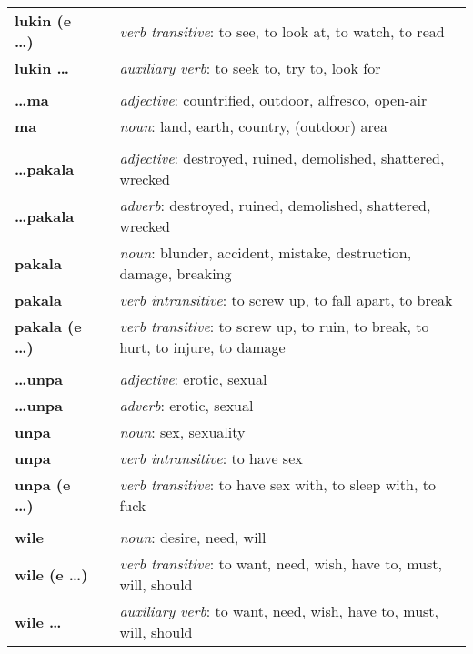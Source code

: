 \begin{supertabular}{p{2,5cm}|ll}
\textbf{lukin (e \dots)} && \textit{verb transitive}: to see, to look at, to watch, to read \\ %
\textbf{lukin \dots} && \textit{auxiliary verb}: to seek to, try to, look for \\ %
 && \\ %
\textbf{\dots ma} && \textit{adjective}: countrified, outdoor, alfresco, open-air \\ %
\textbf{ma} && \textit{noun}: land, earth, country, (outdoor) area \\ %
 && \\ %
\textbf{\dots pakala} && \textit{adjective}: destroyed, ruined, demolished, shattered, wrecked \\ %
\textbf{\dots pakala} && \textit{adverb}: destroyed, ruined, demolished, shattered, wrecked \\ %
\textbf{pakala} && \textit{noun}: blunder, accident, mistake, destruction, damage, breaking \\ %
\textbf{pakala} && \textit{verb intransitive}: to screw up, to fall apart, to break \\ %
\textbf{pakala (e \dots)} && \textit{verb transitive}: to screw up, to ruin, to break, to hurt, to injure, to damage \\ %
 && \\ %
\textbf{\dots unpa} && \textit{adjective}: erotic, sexual \\ %
\textbf{\dots unpa} && \textit{adverb}: erotic, sexual \\ %
\textbf{unpa} && \textit{noun}: sex, sexuality \\ %
\textbf{unpa} && \textit{verb intransitive}: to have sex \\ %
\textbf{unpa (e \dots)} && \textit{verb transitive}: to have sex with, to sleep with, to fuck \\ %
 && \\ %
\textbf{wile} && \textit{noun}: desire, need, will \\ %
\textbf{wile (e \dots)} && \textit{verb transitive}: to want, need, wish, have to, must, will, should \\ %
\textbf{wile \dots} && \textit{auxiliary verb}: to want, need, wish, have to, must, will, should \\ %
\end{supertabular} \\
%
\newpage
